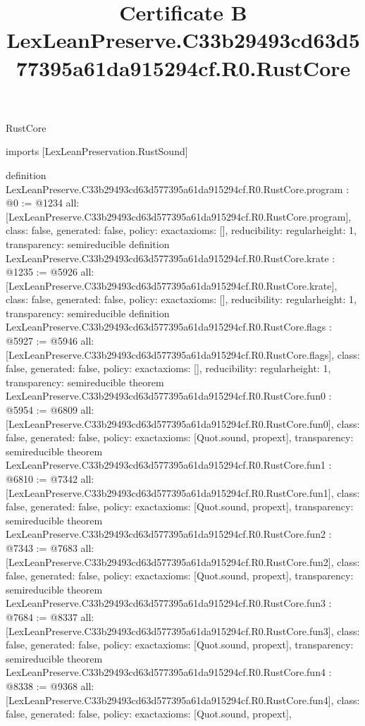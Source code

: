 \begin{lexlean}{RustCore}
\title{Certificate B LexLeanPreserve.C33b29493cd63d577395a61da915294cf.R0.RustCore}
\begin{coremodule}
imports [LexLeanPreservation.RustSound]

definition LexLeanPreserve.C33b29493cd63d577395a61da915294cf.R0.RustCore.program : @0 := @1234 {
  all: [LexLeanPreserve.C33b29493cd63d577395a61da915294cf.R0.RustCore.program],
  class: false,
  generated: false,
  policy: exact{axioms: []},
  reducibility: regular{height: 1},
  transparency: semireducible
}
definition LexLeanPreserve.C33b29493cd63d577395a61da915294cf.R0.RustCore.krate : @1235 := @5926 {
  all: [LexLeanPreserve.C33b29493cd63d577395a61da915294cf.R0.RustCore.krate],
  class: false,
  generated: false,
  policy: exact{axioms: []},
  reducibility: regular{height: 1},
  transparency: semireducible
}
definition LexLeanPreserve.C33b29493cd63d577395a61da915294cf.R0.RustCore.flags : @5927 := @5946 {
  all: [LexLeanPreserve.C33b29493cd63d577395a61da915294cf.R0.RustCore.flags],
  class: false,
  generated: false,
  policy: exact{axioms: []},
  reducibility: regular{height: 1},
  transparency: semireducible
}
theorem LexLeanPreserve.C33b29493cd63d577395a61da915294cf.R0.RustCore.fun0 : @5954 := @6809 {
  all: [LexLeanPreserve.C33b29493cd63d577395a61da915294cf.R0.RustCore.fun0],
  class: false,
  generated: false,
  policy: exact{axioms: [Quot.sound, propext]},
  transparency: semireducible
}
theorem LexLeanPreserve.C33b29493cd63d577395a61da915294cf.R0.RustCore.fun1 : @6810 := @7342 {
  all: [LexLeanPreserve.C33b29493cd63d577395a61da915294cf.R0.RustCore.fun1],
  class: false,
  generated: false,
  policy: exact{axioms: [Quot.sound, propext]},
  transparency: semireducible
}
theorem LexLeanPreserve.C33b29493cd63d577395a61da915294cf.R0.RustCore.fun2 : @7343 := @7683 {
  all: [LexLeanPreserve.C33b29493cd63d577395a61da915294cf.R0.RustCore.fun2],
  class: false,
  generated: false,
  policy: exact{axioms: [Quot.sound, propext]},
  transparency: semireducible
}
theorem LexLeanPreserve.C33b29493cd63d577395a61da915294cf.R0.RustCore.fun3 : @7684 := @8337 {
  all: [LexLeanPreserve.C33b29493cd63d577395a61da915294cf.R0.RustCore.fun3],
  class: false,
  generated: false,
  policy: exact{axioms: [Quot.sound, propext]},
  transparency: semireducible
}
theorem LexLeanPreserve.C33b29493cd63d577395a61da915294cf.R0.RustCore.fun4 : @8338 := @9368 {
  all: [LexLeanPreserve.C33b29493cd63d577395a61da915294cf.R0.RustCore.fun4],
  class: false,
  generated: false,
  policy: exact{axioms: [Quot.sound, propext]},
}
\end{coremodule}
\end{lexlean}
